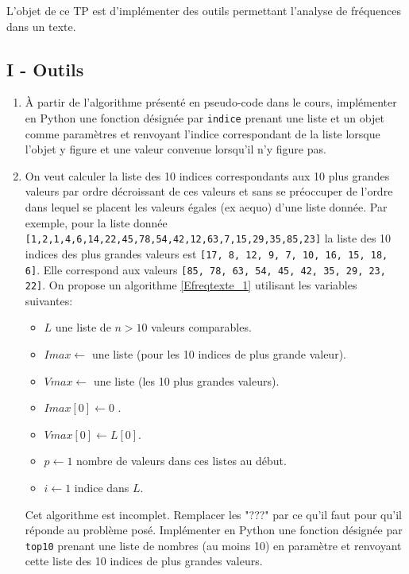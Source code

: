 L'objet de ce TP est d'implémenter des outils permettant l'analyse de fréquences dans un texte.
\subsection*{I - Outils}
\begin{enumerate}
  \item \`A partir de l'algorithme présenté en pseudo-code dans le cours, implémenter en Python une fonction désignée par \verb|indice| prenant une liste et un objet comme paramètres et renvoyant l'indice correspondant de la liste lorsque l'objet y figure et une valeur convenue lorsqu'il n'y figure pas.
  
  \item On veut calculer la liste des 10 indices correspondants aux 10 plus grandes valeurs par ordre décroissant de ces valeurs et sans se préoccuper de l'ordre dans lequel se placent les valeurs égales (ex aequo) d'une liste donnée. \newline
  Par exemple, pour la liste donnée\newline
  \verb|[1,2,1,4,6,14,22,45,78,54,42,12,63,7,15,29,35,85,23]|\newline
  la liste des 10 indices des plus grandes valeurs est\newline
  \verb|[17, 8, 12, 9, 7, 10, 16, 15, 18, 6]|. Elle correspond aux valeurs\newline
  \verb|[85, 78, 63, 54, 45, 42, 35, 29, 23, 22]|.
On propose un algorithme \ref{Efreqtexte_1} utilisant les variables suivantes:
\begin{itemize}
  \item $L$ une liste de $n>10$ valeurs comparables.
  \item $Imax\leftarrow$ une liste (pour les 10 indices de plus grande valeur).
  \item $Vmax\leftarrow$ une liste (les 10 plus grandes valeurs).
  \item $Imax[0]\leftarrow 0$ .
  \item $Vmax[0]\leftarrow L[0]$.
  \item $p\leftarrow 1$ nombre de valeurs dans ces listes au début.
  \item $i\leftarrow 1$ indice dans $L$.
\end{itemize}
Cet algorithme est incomplet. Remplacer les "???" par ce qu'il faut pour qu'il réponde au problème posé.\newline
Implémenter en Python une fonction désignée par \verb|top10| prenant une liste de nombres (au moins 10) en paramètre et renvoyant cette liste des 10 indices de plus grandes valeurs.

\end{enumerate}
